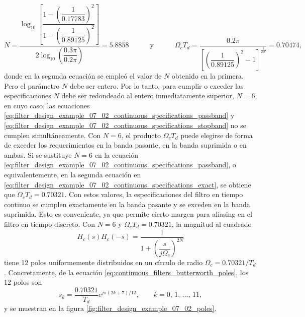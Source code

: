 \documentclass[a4paper]{report}
\begin{document}
\begin{equation}\label{eq:filter_design_example_07_02_continuous_specifications_exact}
 N=\dfrac{\log_{10}\left[\dfrac{1-\left(\dfrac{1}{0.17783}\right)^2}{1-\left(\dfrac{1}{0.89125}\right)^2}\right]}{2\log_{10}\left(\dfrac{0.3\pi}{0.2\pi}\right)}=5.8858
 \qquad\quad\textrm{y}\qquad\quad
 \Omega_c T_d=\dfrac{0.2\pi}{\left[\left(\dfrac{1}{0.89125}\right)^2-1\right]^{\frac{1}{2N}}}=0.70474, 
\end{equation}
donde en la segunda ecuación se empleó el valor de \(N\) obtenido en la primera.
Pero el parámetro \(N\) debe ser entero. Por lo tanto, para cumplir o exceder las especificaciones \(N\) debe ser redondeado al entero inmediatamente superior, \(N=6\), en cuyo caso, las ecuaciones \ref{eq:filter_design_example_07_02_continuous_specifications_passband} y \ref{eq:filter_design_example_07_02_continuous_specifications_stopband} no se cumplen simultáneamente. Con \(N=6\), el producto \(\Omega_c T_d\) puede elegirse de forma de exceder los requerimientos en la banda pasante, en la banda suprimida o en ambas. Si se sustituye \(N=6\) en la ecuación \ref{eq:filter_design_example_07_02_continuous_specifications_passband}, o equivalentemente, en la segunda ecuación en \ref{eq:filter_design_example_07_02_continuous_specifications_exact}, se obtiene que \(\Omega_c T_d=0.70321\). Con estos valores, la especificaciones del filtro en tiempo continuo se cumplen exactamente en la banda pasante y se exceden en la banda suprimida. Esto es conveniente, ya que permite cierto margen para aliasing en el filtro en tiempo discreto. Con \(N=6\) y \(\Omega_c T_d=0.70321\), la magnitud al cuadrado 
\[
  H_c(s)H_c(-s)=\frac{1}{1+\left(\dfrac{s}{j\Omega_c}\right)^{2N}}
\]
tiene 12 polos uniformemente distribuidos en un círculo de radio \(\Omega_c=0.70321/T_d\). Concretamente, de la ecuación \ref{eq:continuous_filters_butterworth_poles}, los 12 polos son
\[
 s_k=\frac{0.70321}{T_d}e^{j\pi(2k+7)/12},
 \qquad 
 k=0,\,1,\,\dots,\,11,
\]
y se muestran en la figura \ref{fig:filter_design_example_07_02_poles}. 
\end{document}
